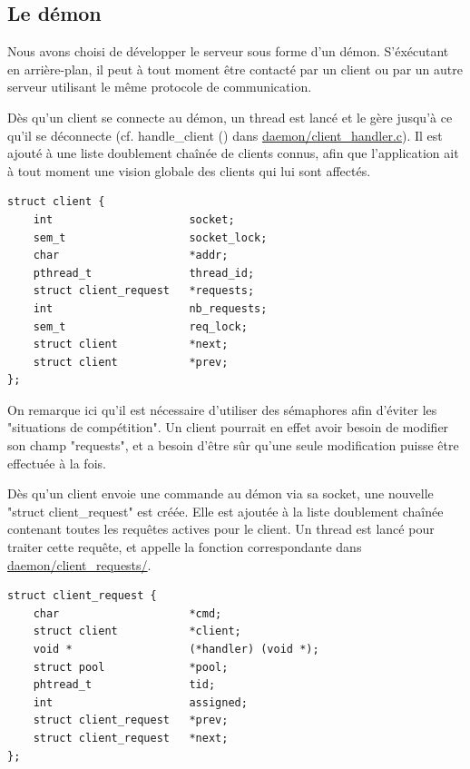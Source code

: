	
\subsection{Le démon}

    Nous avons choisi de développer le serveur sous forme d'un démon.
S'éxécutant en arrière-plan, il peut à tout moment être contacté par un client
ou par un autre serveur utilisant le même protocole de communication.

    Dès qu'un client se connecte au démon, un thread est lancé et le gère
jusqu'à ce qu'il se déconnecte (cf. handle\_client () dans
\url{daemon/client_handler.c}). Il est ajouté à une liste doublement chaînée de
 clients connus, afin que l'application ait à tout moment une vision globale 
des clients qui lui sont affectés. 

\begin{lstlisting}
struct client {
    int                     socket;
    sem_t                   socket_lock;
    char                    *addr;
    pthread_t               thread_id;
    struct client_request   *requests;
    int                     nb_requests;
    sem_t                   req_lock;
    struct client           *next;
    struct client           *prev;
};
\end{lstlisting}

    On remarque ici qu'il est nécessaire d'utiliser des sémaphores afin d'éviter
les "situations de compétition". Un client pourrait en effet avoir besoin de
modifier son champ "requests", et a besoin d'être sûr qu'une seule modification
puisse être effectuée à la fois.

    Dès qu'un client envoie une commande au démon via sa socket, une nouvelle
"struct client\_request" est créée. Elle est ajoutée à la liste doublement
chaînée contenant toutes les requêtes actives pour le client. Un thread est
lancé pour traiter cette requête, et appelle la fonction correspondante dans
\url{daemon/client_requests/}.

\begin{lstlisting}
struct client_request {
    char                    *cmd;
    struct client           *client;
    void *                  (*handler) (void *);
    struct pool             *pool;
    phtread_t               tid;
    int                     assigned;
    struct client_request   *prev;
    struct client_request   *next;
};
\end{lstlisting}


